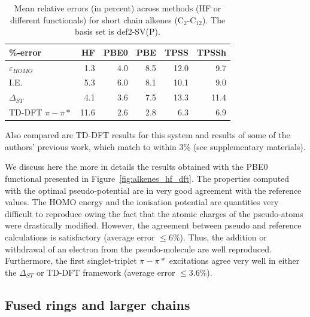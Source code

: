 \documentclass[aip,reprint]{revtex4-1}
\begin{document}
\begin{table}[ht]
\caption{Mean relative errors (in percent) across methods (HF or different functionals)
for short chain alkenes  (C\(_{2}\)-C\(_{12}\)).
The basis set is def2-SV(P).}
\begin{tabular}{l r r r r r }
\hline \hline
\%-error                & HF & PBE0 & PBE & TPSS & TPSSh \\
\hline
$\varepsilon_{HOMO}$    & 1.3 & 4.0 & 8.5 & 12.0 &  9.7 \\
I.E.                    & 5.3 & 6.0 & 8.1 & 10.1 &  9.0 \\
$\Delta_{ST}$           & 4.1 & 3.6 & 7.5 & 13.3 & 11.4 \\
TD-DFT $\pi-\pi*$       & 11.6 & 2.6 & 2.8 &  6.3 &  6.9 \\ 
\hline\hline
\end{tabular}
\label{table:alkene_errors}
\end{table}

Also compared are TD-DFT results for this system and results of some of the authors' previous work,
which match to within 3\% (see supplementary materials).\cite{drujon_pseudopotentials_2013}

We discuss here the more in details the results obtained with the PBE0 functional presented in Figure~\ref{fig:alkenes_hf_dft}.
The properties computed with the optimal pseudo-potential are in very good
agreement with the reference values.
The HOMO energy and the ionisation potential are quantities very difficult to reproduce
owing the fact that the atomic charges of the pseudo-atoms were drastically modified.
However, the agreement between pseudo and reference calculations is satisfactory
(average error $\le 6\%$).
Thus, the addition or withdrawal of an electron from the pseudo-molecule are well reproduced.
Furthermore, the first singlet-triplet $\pi-\pi*$ excitations agree very well in either
the $\Delta_{ST}$ or TD-DFT framework (average error $\le 3.6\%$).


\subsection{Fused rings and larger chains}
\end{document}
